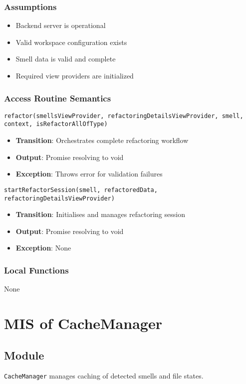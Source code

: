\documentclass[12pt, titlepage]{article}
\begin{document}
\subsubsection{Assumptions}
\begin{itemize}
\item Backend server is operational
\item Valid workspace configuration exists
\item Smell data is valid and complete
\item Required view providers are initialized
\end{itemize}

\subsubsection{Access Routine Semantics}
\texttt{refactor(smellsViewProvider, refactoringDetailsViewProvider, smell, context, isRefactorAllOfType)}
\begin{itemize}
\item \textbf{Transition}: Orchestrates complete refactoring workflow
\item \textbf{Output}: Promise resolving to void
\item \textbf{Exception}: Throws error for validation failures
\end{itemize}

\texttt{startRefactorSession(smell, refactoredData, refactoringDetailsViewProvider)}
\begin{itemize}
\item \textbf{Transition}: Initialises and manages refactoring session
\item \textbf{Output}: Promise resolving to void
\item \textbf{Exception}: None
\end{itemize}

\subsubsection{Local Functions}
None

\section{MIS of CacheManager}

\subsection{Module}
\texttt{CacheManager} manages caching of detected smells and file states.
\end{document}
